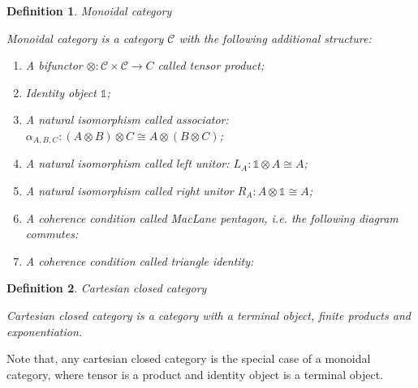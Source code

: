 \documentclass[a4paper]{article}
\newtheorem{defin}{Definition}
\begin{document}
\begin{defin} Monoidal category

  Monoidal category is a category $\mathcal{C}$ with the following additional structure:
  \begin{enumerate}
    \item A bifunctor $\otimes : \mathcal{C} \times \mathcal{C} \to C$ called tensor product;
    \item Identity object $\mathds{1}$;
    \item A natural isomorphism called associator: $\alpha_{A,B,C}: (A \otimes B) \otimes C \cong A \otimes (B \otimes C)$;
    \item A natural isomorphism called left unitor: $L_A : \mathds{1} \otimes A \cong A$;
    \item A natural isomorphism called right unitor $R_A : A \otimes \mathds{1} \cong A$;
    \item A coherence condition called MacLane pentagon, i.e. the following diagram commutes:

    \item A coherence condition called triangle identity:

  \end{enumerate}
\end{defin}

\begin{defin} Cartesian closed category

  Cartesian closed category is a category with a terminal object, finite products and exponentiation.
\end{defin}

Note that, any cartesian closed category is the special case of a monoidal category, where tensor is a product and identity object is a terminal object.
\end{document}
